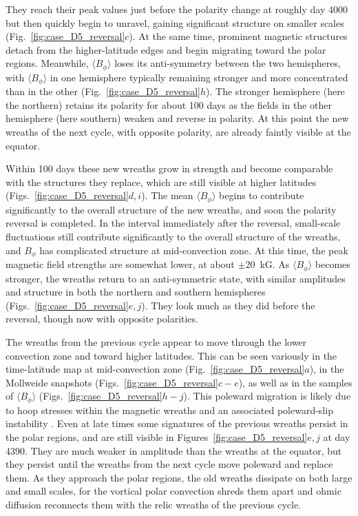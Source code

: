 They reach their peak values just before the polarity change at
roughly day 4000 but then quickly begin to unravel, gaining
significant structure on smaller 
scales (Fig.~\ref{fig:case_D5_reversal}$c$).  At the same time,
prominent magnetic structures detach from the higher-latitude edges and
begin migrating toward the polar regions.  
Meanwhile, $\langle B_\phi \rangle$  loses its anti-symmetry between
the two hemispheres, with $\langle B_\phi \rangle$ in one hemisphere
typically remaining stronger and more concentrated than in the other
(Fig.~\ref{fig:case_D5_reversal}$h$).  The stronger
hemisphere (here the northern) retains its polarity for about 100 days
as the fields in the other hemisphere (here southern) weaken and
reverse in polarity.  At this point the new wreaths of the next
cycle, with opposite polarity, are already faintly visible at the
equator. 

Within 100 days these new wreaths grow in strength and become
comparable with the structures they replace, which are still visible at
higher latitudes (Figs.~\ref{fig:case_D5_reversal}$d, i$).  The
mean $\langle B_\phi \rangle$ begins to contribute
significantly to the overall structure of the new wreaths, and soon
the polarity reversal is completed.  In the interval immediately after
the reversal, small-scale fluctuations still contribute significantly
to the overall structure of the wreaths, and $B_\phi$ has complicated
structure at mid-convection zone.  At this time, the peak magnetic
field strengths are somewhat lower, at about $\pm 20$~kG. 
As $\langle B_\phi \rangle$ becomes stronger, the wreaths return to an
anti-symmetric state, with 
similar amplitudes and structure in both the northern and southern
hemispheres (Figs.~\ref{fig:case_D5_reversal}$e,j$).  They look much
as they did before the reversal, though now with opposite polarities.
  
The wreaths from the previous cycle appear to move through the lower
convection zone and toward higher latitudes.  This can be
seen variously in the time-latitude map at mid-convection zone
(Fig.~\ref{fig:case_D5_reversal}$a$), in the Mollweide snapshots
(Figs.~\ref{fig:case_D5_reversal}$c-e$), as well as in the 
samples of $\langle B_\phi \rangle$ (Figs.~\ref{fig:case_D5_reversal}$h-j$).  
This poleward migration is likely due to hoop stresses within the
magnetic wreaths and an associated poleward-slip instability
\citep[e.g.,][]{Spruit&vanBallegooijen_1982, Moreno-Insertis_et_al_1992}.
Even at late times some signatures of the previous wreaths persist in
the polar regions, and are still visible in Figures~\ref{fig:case_D5_reversal}$e,j$ at
day 4390.  They are much weaker in amplitude than the wreaths
at the equator, but they persist until the wreaths from the next
cycle move poleward and  replace them.   As they approach the polar
regions, the old wreaths dissipate on both large and small scales, for
the vortical polar convection shreds them apart and ohmic diffusion
reconnects them with the relic wreaths of the previous cycle.

